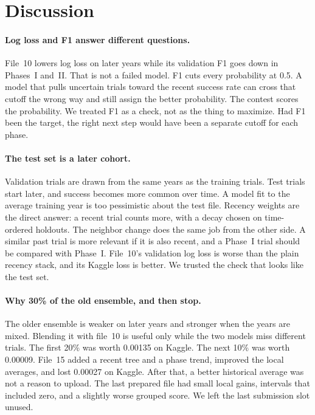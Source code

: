 \section{Discussion}
\label{sec:discussion}

\paragraph{Log loss and F1 answer different questions.}
File~10 lowers log loss on later years while its validation F1 goes down in
Phases~I and~II. That is not a failed model. F1 cuts every probability at
0.5. A model that pulls uncertain trials toward the recent success rate can
cross that cutoff the wrong way and still assign the better probability.
The contest scores the probability. We treated F1 as a check, not as the
thing to maximize. Had F1 been the target, the right next step would have
been a separate cutoff for each phase.

\paragraph{The test set is a later cohort.}
Validation trials are drawn from the same years as the training trials. Test
trials start later, and success becomes more common over time. A model fit to
the average training year is too pessimistic about the test file. Recency
weights are the direct answer: a recent trial counts more, with a decay
chosen on time-ordered holdouts. The neighbor change does the same job from
the other side. A similar past trial is more relevant if it is also recent,
and a Phase~I trial should be compared with Phase~I. File~10's validation
log loss is worse than the plain recency stack, and its Kaggle loss is
better. We trusted the check that looks like the test set.

\paragraph{Why 30\% of the old ensemble, and then stop.}
The older ensemble is weaker on later years and stronger when the years are
mixed. Blending it with file~10 is useful only while the two models miss
different trials. The first 20\% was worth 0.00135 on Kaggle. The next 10\%
was worth 0.00009. File~15 added a recent tree and a phase trend, improved
the local averages, and lost 0.00027 on Kaggle. After that, a better
historical average was not a reason to upload. The last prepared file had
small local gains, intervals that included zero, and a slightly worse grouped
score. We left the last submission slot unused.

